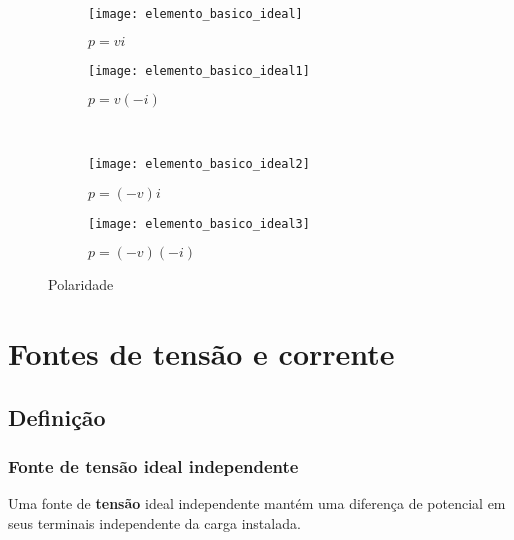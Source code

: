 \documentclass[12pt,fleqn]{book} %
\begin{document}
	        \begin{figure*}[h]
    \centering
    \begin{subfigure}{0.5\textwidth}
        \centering
        \texttt{[image: elemento\_basico\_ideal]}
        \caption{$p = vi$}
    \end{subfigure}%
    \begin{subfigure}{0.5\textwidth}
        \centering
        \texttt{[image: elemento\_basico\_ideal1]}
        \caption{$p = v(-i)$}
    \end{subfigure}
    ~ 
    \begin{subfigure}[t]{0.5\textwidth}
        \centering
        \texttt{[image: elemento\_basico\_ideal2]}
        \caption{$p = (-v)i$}
    \end{subfigure}%
    \begin{subfigure}[t]{0.5\textwidth}
        \centering
        \texttt{[image: elemento\_basico\_ideal3]}
        \caption{$p = (-v)(-i)$}
    \end{subfigure}
    \caption{Polaridade}
\end{figure*}
	
	
	
	
	
	\chapter{Fontes de tensão e corrente}
	    
	    \section{Definição}
	        
	        \subsection{Fonte de tensão ideal independente}
	        
	        \begin{definition}
	            Uma fonte de \textbf{tensão} ideal independente mantém uma diferença de potencial em seus terminais independente da carga instalada.
	        \end{definition}
	        
\end{document}
